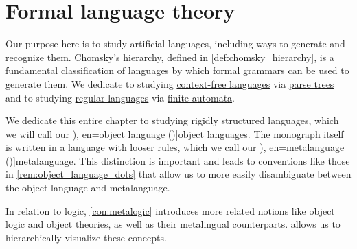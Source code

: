 \chapter{Formal language theory}\label{ch:formal_language_theory}

Our purpose here is to study artificial languages, including ways to generate and recognize them. Chomsky's hierarchy, defined in \cref{def:chomsky_hierarchy}, is a fundamental classification of languages by which \hyperref[def:formal_grammar]{formal grammars} can be used to generate them. We dedicate  to studying \hyperref[def:chomsky_hierarchy/context_free]{context-free languages} via \hyperref[def:parse_tree]{parse trees} and  to studying \hyperref[def:chomsky_hierarchy/regular]{regular languages} via \hyperref[def:finite_automaton]{finite automata}.

\begin{concept}\label{con:metalanguage}
  We dedicate this entire chapter to studying rigidly structured languages, which we will call our \term[ru=предметный язык (\cite[44]{Герасимов2014Вычислимость}), en=object language (\cite[3]{Kleene2002Logic})]{object languages}. The monograph itself is written in a language with looser rules, which we call our \term[ru=метаязык (\cite[44]{Герасимов2014Вычислимость}), en=metalanguage (\cite[3]{Kleene2002Logic})]{metalanguage}. This distinction is important and leads to conventions like those in \cref{rem:object_language_dots} that allow us to more easily disambiguate between the object language and metalanguage.

  In relation to logic, \cref{con:metalogic} introduces more related notions like object logic and object theories, as well as their metalingual counterparts.  allows us to hierarchically visualize these concepts.
\end{concept}

